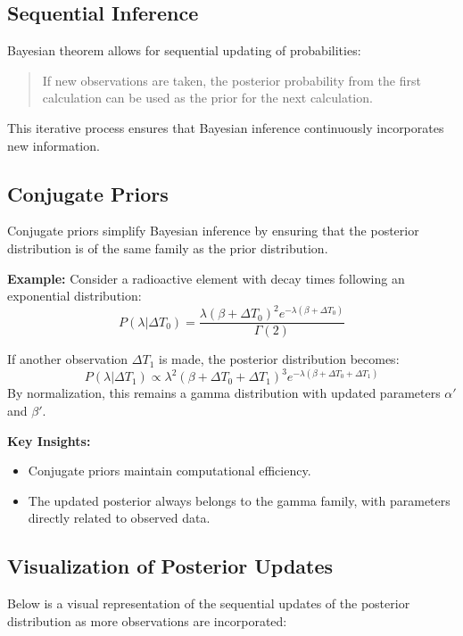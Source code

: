 \documentclass[12pt,a4paper]{article}
\begin{document}
\subsection{Sequential Inference}
Bayesian theorem allows for sequential updating of probabilities:
\begin{quote}
    If new observations are taken, the posterior probability from the first calculation can be used as the prior for the next calculation.
\end{quote}

This iterative process ensures that Bayesian inference continuously incorporates new information.

\subsection{Conjugate Priors}
Conjugate priors simplify Bayesian inference by ensuring that the posterior distribution is of the same family as the prior distribution.

\textbf{Example:}
Consider a radioactive element with decay times following an exponential distribution:
\begin{equation}
P(\lambda|\Delta T_0) = \frac{\lambda (\beta + \Delta T_0)^2 e^{-\lambda (\beta + \Delta T_0)}}{\Gamma(2)}
\end{equation}

If another observation $\Delta T_1$ is made, the posterior distribution becomes:
\begin{equation}
P(\lambda|\Delta T_1) \propto \lambda^2 (\beta + \Delta T_0 + \Delta T_1)^3 e^{-\lambda (\beta + \Delta T_0 + \Delta T_1)}
\end{equation}
By normalization, this remains a gamma distribution with updated parameters $\alpha'$ and $\beta'$.

\textbf{Key Insights:}
\begin{itemize}
    \item Conjugate priors maintain computational efficiency.
    \item The updated posterior always belongs to the gamma family, with parameters directly related to observed data.
\end{itemize}

\subsection{Visualization of Posterior Updates}
Below is a visual representation of the sequential updates of the posterior distribution as more observations are incorporated:
\end{document}
